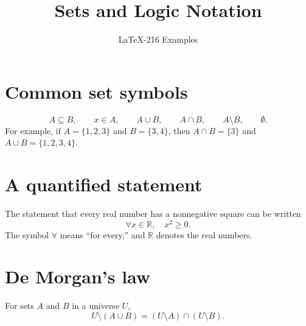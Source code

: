 \documentclass{article}
\title{Sets and Logic Notation}
\author{LaTeX-216 Examples}
\date{}
\begin{document}
\maketitle

\section{Common set symbols}
\[
  A \subseteq B, \qquad x \in A, \qquad
  A \cup B, \qquad A \cap B, \qquad A \setminus B, \qquad \emptyset.
\]
For example, if $A=\{1,2,3\}$ and $B=\{3,4\}$, then
$A\cap B=\{3\}$ and $A\cup B=\{1,2,3,4\}$.

\section{A quantified statement}
The statement that every real number has a nonnegative square can be written
\[
  \forall x\in\mathbb{R},\quad x^2\ge 0.
\]
The symbol $\forall$ means ``for every,'' and $\mathbb{R}$ denotes the real
numbers.

\section{De Morgan's law}
For sets $A$ and $B$ in a universe $U$,
\[
  U\setminus(A\cup B) = (U\setminus A)\cap(U\setminus B).
\]
\end{document}
